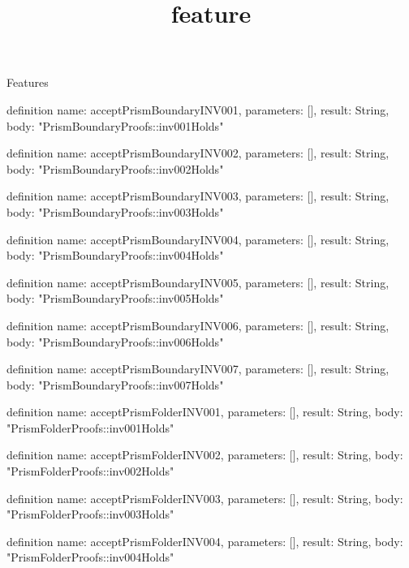 \begin{lexlean}{Features}
\title{feature}
\begin{semanticmodule}
definition{
  name: acceptPrismBoundaryINV001,
  parameters: [],
  result: String,
  body: "PrismBoundaryProofs::inv001Holds"
}

definition{
  name: acceptPrismBoundaryINV002,
  parameters: [],
  result: String,
  body: "PrismBoundaryProofs::inv002Holds"
}

definition{
  name: acceptPrismBoundaryINV003,
  parameters: [],
  result: String,
  body: "PrismBoundaryProofs::inv003Holds"
}

definition{
  name: acceptPrismBoundaryINV004,
  parameters: [],
  result: String,
  body: "PrismBoundaryProofs::inv004Holds"
}

definition{
  name: acceptPrismBoundaryINV005,
  parameters: [],
  result: String,
  body: "PrismBoundaryProofs::inv005Holds"
}

definition{
  name: acceptPrismBoundaryINV006,
  parameters: [],
  result: String,
  body: "PrismBoundaryProofs::inv006Holds"
}

definition{
  name: acceptPrismBoundaryINV007,
  parameters: [],
  result: String,
  body: "PrismBoundaryProofs::inv007Holds"
}

definition{
  name: acceptPrismFolderINV001,
  parameters: [],
  result: String,
  body: "PrismFolderProofs::inv001Holds"
}

definition{
  name: acceptPrismFolderINV002,
  parameters: [],
  result: String,
  body: "PrismFolderProofs::inv002Holds"
}

definition{
  name: acceptPrismFolderINV003,
  parameters: [],
  result: String,
  body: "PrismFolderProofs::inv003Holds"
}

definition{
  name: acceptPrismFolderINV004,
  parameters: [],
  result: String,
  body: "PrismFolderProofs::inv004Holds"
}


\end{semanticmodule}
\end{lexlean}

